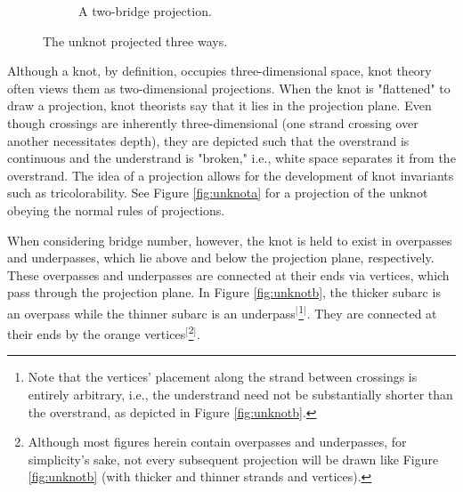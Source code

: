 \documentclass[titlepage,11pt]{article}
\begin{document}
\begin{figure}[h!]
\begin{subfigure}[b]{0.3\linewidth}
        \caption{A two-bridge projection.}
        \label{fig:unknotc}
    \end{subfigure}
    \caption{The unknot projected three ways.}
    \label{fig:unknot}
\end{figure}

\noindent Although a knot, by definition, occupies three-dimensional space, knot theory often views them as two-dimensional projections. When the knot is "flattened" to draw a projection, knot theorists say that it lies in the projection plane. Even though crossings are inherently three-dimensional (one strand crossing over another necessitates depth), they are depicted such that the overstrand is continuous and the understrand is "broken," i.e., white space separates it from the overstrand. The idea of a projection allows for the development of knot invariants such as tricolorability. See Figure \ref{fig:unknota} for a projection of the unknot obeying the normal rules of projections.\par
When considering bridge number, however, the knot is held to exist in overpasses and underpasses, which lie above and below the projection plane, respectively. These overpasses and underpasses are connected at their ends via vertices, which pass through the projection plane. In Figure \ref{fig:unknotb}, the thicker subarc is an overpass while the thinner subarc is an underpass$^[$\footnote{Note that the vertices' placement along the strand between crossings is entirely arbitrary, i.e., the understrand need not be substantially shorter than the overstrand, as depicted in Figure \ref{fig:unknotb}.}$^]$. They are connected at their ends by the orange vertices$^[$\footnote{Although most figures herein contain overpasses and underpasses, for simplicity's sake, not every subsequent projection will be drawn like Figure \ref{fig:unknotb} (with thicker and thinner strands and vertices).}$^]$.\par
\end{document}
